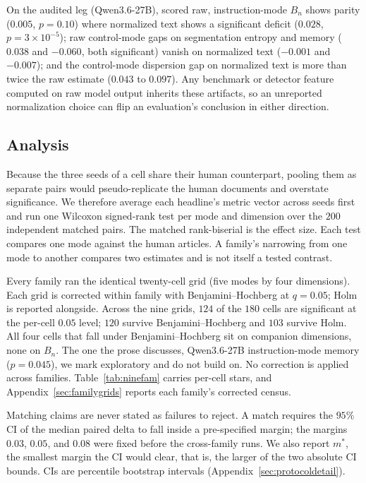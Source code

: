 \documentclass{article}
\begin{document}
On the audited leg (Qwen3.6-27B), scored raw, instruction-mode $B_n$ shows
parity ($0.005$, $p=0.10$) where normalized text shows a significant deficit
($0.028$, $p=3\times10^{-5}$); raw control-mode gaps on segmentation entropy
and memory ($0.038$ and $-0.060$, both significant) vanish on normalized
text ($-0.001$ and $-0.007$); and the control-mode dispersion gap on
normalized text is more than twice the raw estimate ($0.043$ to $0.097$).
Any benchmark or detector feature computed on raw model output inherits
these artifacts, so an unreported normalization choice can flip an
evaluation's conclusion in either direction.

\subsection{Analysis}
\label{sec:analysis}
Because the three seeds of a cell share their human counterpart, pooling them as separate pairs would
pseudo-replicate the human documents and overstate significance. We therefore average each headline's
metric vector across seeds first and run one Wilcoxon signed-rank test per mode and dimension over
the $200$ independent matched pairs. The matched rank-biserial is the effect size. Each test compares
one mode against the human articles. A family's narrowing from one mode to another compares two
estimates and is not itself a tested contrast.

Every family ran the identical twenty-cell grid (five modes by four dimensions). Each grid is
corrected within family with Benjamini--Hochberg at $q=0.05$; Holm is reported alongside.
Across the nine grids, $124$ of the $180$ cells are significant at the per-cell $0.05$ level;
$120$ survive Benjamini--Hochberg and $103$ survive Holm. All four cells that fall under
Benjamini--Hochberg sit on companion dimensions, none on $B_n$. The one the prose discusses,
Qwen3.6-27B instruction-mode memory ($p=0.045$), we mark exploratory and do not build on.
No correction is applied across families. Table~\ref{tab:ninefam} carries per-cell stars, and
Appendix~\ref{sec:familygrids} reports each family's corrected census.

Matching claims are never stated as failures to reject. A match requires the $95\%$ CI of the
median paired delta to fall inside a pre-specified margin; the margins $0.03$, $0.05$, and $0.08$
were fixed before the cross-family runs. We also report $m^{*}$, the smallest margin the CI would
clear, that is, the larger of the two absolute CI bounds. CIs are percentile bootstrap intervals
(Appendix~\ref{sec:protocoldetail}).
\end{document}
